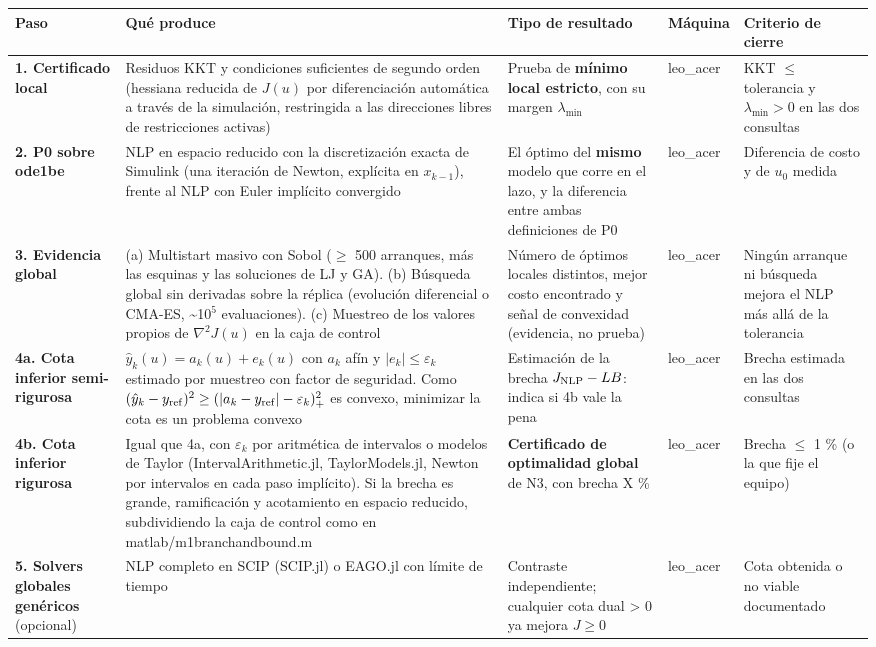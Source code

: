 \documentclass[11pt,a4paper]{article}
\newcommand{\codeus}{\textunderscore\allowbreak}
\newcommand{\code}[1]{{\small\ttfamily\let\_\codeus #1}}
\begin{document}
{\footnotesize
\begin{xltabular}{\linewidth}{@{}YYYYY@{}}
\toprule
\textbf{Paso} & \textbf{Qué produce} & \textbf{Tipo de resultado} & \textbf{Máquina} & \textbf{Criterio de cierre} \\
\midrule
\endhead
\textbf{1. Certificado local} & Residuos KKT y condiciones suficientes de segundo orden (hessiana reducida de $J(u)$ por diferenciación automática a través de la simulación, restringida a las direcciones libres de restricciones activas) & Prueba de \textbf{mínimo local estricto}, con su margen $\lambda_{\min}$ & leo\_acer & KKT $\le$ tolerancia y $\lambda_{\min}>0$ en las dos consultas \\
\textbf{2. P0 sobre \code{ode1be}} & NLP en espacio reducido con la discretización exacta de Simulink (una iteración de Newton, explícita en $x_{k-1}$), frente al NLP con Euler implícito convergido & El óptimo del \textbf{mismo} modelo que corre en el lazo, y la diferencia entre ambas definiciones de P0 & leo\_acer & Diferencia de costo y de $u_0$ medida \\
\textbf{3. Evidencia global} & (a) Multistart masivo con Sobol ($\ge$ 500 arranques, más las esquinas y las soluciones de LJ y GA). (b) Búsqueda global sin derivadas sobre la réplica (evolución diferencial o CMA-ES, \textasciitilde{}10$^{5}$ evaluaciones). (c) Muestreo de los valores propios de $\nabla^2J(u)$ en la caja de control & Número de óptimos locales distintos, mejor costo encontrado y señal de convexidad (evidencia, no prueba) & leo\_acer & Ningún arranque ni búsqueda mejora el NLP más allá de la tolerancia \\
\textbf{4a. Cota inferior semi-rigurosa} & $\hat y_k(u)=a_k(u)+e_k(u)$ con $a_k$ afín y $\lvert e_k\rvert\le\varepsilon_k$ estimado por muestreo con factor de seguridad. Como $(\hat y_k-y_{\rm ref})^2\ge(\lvert a_k-y_{\rm ref}\rvert-\varepsilon_k)_+^2$ es convexo, minimizar la cota es un problema convexo & Estimación de la brecha $J_{\rm NLP}-LB$: indica si 4b vale la pena & leo\_acer & Brecha estimada en las dos consultas \\
\textbf{4b. Cota inferior rigurosa} & Igual que 4a, con $\varepsilon_k$ por aritmética de intervalos o modelos de Taylor (\code{IntervalArithmetic.jl}, \code{TaylorModels.jl}, Newton por intervalos en cada paso implícito). Si la brecha es grande, ramificación y acotamiento en espacio reducido, subdividiendo la caja de control como en \code{matlab/m1\_branch\_and\_bound.m} & \textbf{Certificado de optimalidad global} de N3, con brecha X \% & leo\_acer & Brecha $\le$ 1 \% (o la que fije el equipo) \\
\textbf{5. Solvers globales genéricos} (opcional) & NLP completo en SCIP (\code{SCIP.jl}) o EAGO.jl con límite de tiempo & Contraste independiente; cualquier cota dual > 0 ya mejora $J\ge0$ & leo\_acer & Cota obtenida o no viable documentado \\
\bottomrule
\end{xltabular}}
\end{document}
